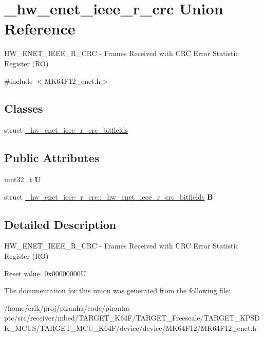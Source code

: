 \hypertarget{union__hw__enet__ieee__r__crc}{}\section{\+\_\+hw\+\_\+enet\+\_\+ieee\+\_\+r\+\_\+crc Union Reference}
\label{union__hw__enet__ieee__r__crc}


H\+W\+\_\+\+E\+N\+E\+T\+\_\+\+I\+E\+E\+E\+\_\+\+R\+\_\+\+C\+RC -\/ Frames Received with C\+RC Error Statistic Register (RO)  




{\ttfamily \#include $<$M\+K64\+F12\+\_\+enet.\+h$>$}

\subsection*{Classes}
\begin{DoxyCompactItemize}
\item 
struct \hyperlink{struct__hw__enet__ieee__r__crc_1_1__hw__enet__ieee__r__crc__bitfields}{\+\_\+hw\+\_\+enet\+\_\+ieee\+\_\+r\+\_\+crc\+\_\+bitfields}
\end{DoxyCompactItemize}
\subsection*{Public Attributes}
\begin{DoxyCompactItemize}
\item 
uint32\+\_\+t {\bfseries U}\hypertarget{union__hw__enet__ieee__r__crc_a9fa30b473156928b24b95bcae68d3700}{}\label{union__hw__enet__ieee__r__crc_a9fa30b473156928b24b95bcae68d3700}

\item 
struct \hyperlink{struct__hw__enet__ieee__r__crc_1_1__hw__enet__ieee__r__crc__bitfields}{\+\_\+hw\+\_\+enet\+\_\+ieee\+\_\+r\+\_\+crc\+::\+\_\+hw\+\_\+enet\+\_\+ieee\+\_\+r\+\_\+crc\+\_\+bitfields} {\bfseries B}\hypertarget{union__hw__enet__ieee__r__crc_ab119c5040429071a5e85952571bc573e}{}\label{union__hw__enet__ieee__r__crc_ab119c5040429071a5e85952571bc573e}

\end{DoxyCompactItemize}


\subsection{Detailed Description}
H\+W\+\_\+\+E\+N\+E\+T\+\_\+\+I\+E\+E\+E\+\_\+\+R\+\_\+\+C\+RC -\/ Frames Received with C\+RC Error Statistic Register (RO) 

Reset value\+: 0x00000000U 

The documentation for this union was generated from the following file\+:\begin{DoxyCompactItemize}
\item 
/home/erik/proj/piranha/code/piranha-\/ptc/src/receiver/mbed/\+T\+A\+R\+G\+E\+T\+\_\+\+K64\+F/\+T\+A\+R\+G\+E\+T\+\_\+\+Freescale/\+T\+A\+R\+G\+E\+T\+\_\+\+K\+P\+S\+D\+K\+\_\+\+M\+C\+U\+S/\+T\+A\+R\+G\+E\+T\+\_\+\+M\+C\+U\+\_\+\+K64\+F/device/device/\+M\+K64\+F12/M\+K64\+F12\+\_\+enet.\+h\end{DoxyCompactItemize}
